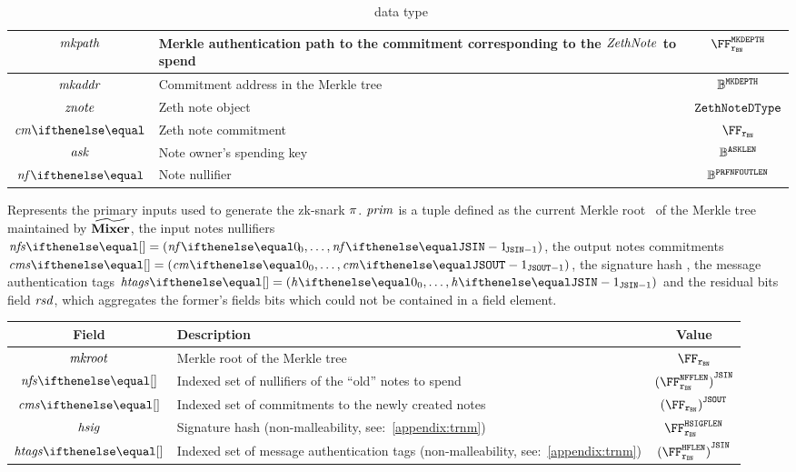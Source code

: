 \begin{description}
\begin{table}[H]
\begin{tabular}{cp{20em}c}
            $\mathit{mkpath}$ & Merkle authentication path to the commitment corresponding to the $\mathit{ZethNote}$ to spend & $\FFx{\rBN}^{\mkTreeDepth}$ \\ \midrule
            $\mathit{mkaddr}$ & Commitment address in the Merkle tree & $\mathbb{B}^{\mathtt{MKDEPTH}}$\\ \midrule
            $\mathit{znote}$ & Zeth note object & ${\mathtt{ZethNoteDType}}$ \\ \midrule
            $\cm{}$ & Zeth note commitment & $\FFx{\rBN}$ \\ \midrule
            $\mathit{ask}$ & Note owner's spending key & $\mathbb{B}^{\mathtt{ASKLEN}}$\\ \midrule
            $\nf{}$ & Note nullifier & $\mathbb{B}^{\mathtt{PRFNFOUTLEN}}$\\ \bottomrule
        \end{tabular}
        \caption{\jsInputDType~data type}\label{zeth-protocol:tab:jsinput}
        \end{table}
    \item[\primInputDType] 
    Represents the primary inputs used to generate the zk-snark $\mathit{\pi}$. $\mathit{prim}$ is a tuple defined as the current Merkle root \mkroot~of the Merkle tree maintained by $\widetilde{\mathbf{Mixer}}$, the input notes nullifiers $\nfs{} = \smalltuple{\nf{0}, \ldots, \nf{\jsin - 1}}$, the output notes commitments $\cms{} = \smalltuple{\cm{0}, \ldots, \cm{\jsout - 1}}$, the signature hash \hsig, the message authentication tags $\htags{} = \smalltuple{\htag{0}, \ldots, \htag{\jsin-1}}$ and the residual bits field $\mathit{rsd}$, which aggregates the former's fields bits which could not be contained in a field element.
        \begin{table}[H]
        \centering
        \begin{tabular}{cp{20em}c}
            Field & Description & Value\\ \toprule
            $\mathit{mkroot}$ & Merkle root of the Merkle tree & $\FFx{\rBN}$ \\ \midrule
            $\nfs{}$ & Indexed set of nullifiers of the ``old'' notes to spend & ${(\FFx{\rBN}^{\nfFLen})}^{\jsin}$\\ \midrule
            $\cms{}$ & Indexed set of commitments to the newly created notes & ${(\FFx{\rBN})}^{\jsout}$\\ \midrule
            $\mathit{hsig}$ & Signature hash (non-malleability, see:~\cref{appendix:trnm}) & $\FFx{\rBN}^{\hsigFLen}$\\ \midrule
            $\htags{}$ & Indexed set of message authentication tags (non-malleability, see:~\cref{appendix:trnm}) & ${(\FFx{\rBN}^{\htagFLen})}^{\jsin}$\\ \midrule

\end{tabular}
\end{table}
\end{description}
